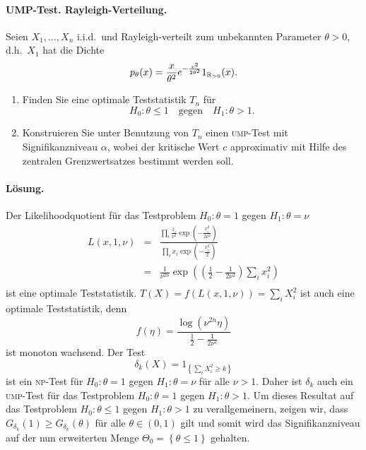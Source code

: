 






\paragraph{UMP-Test. Rayleigh-Verteilung. } Seien $X_1,\ldots,X_n$ i.i.d.\ und Rayleigh-verteilt
zum unbekannten Parameter $\theta>0$, d.h.\ $X_1$ hat die Dichte 
\begin{equation}
    p_\theta(x) = \frac{x}{\theta^2} e^{- \frac{x^2}{2\theta^2}} 1_{\mathbb R_{>0}}(x).
\end{equation}
\begin{enumerate}
    \item Finden Sie eine optimale Teststatistik $T_n$ für
        \begin{equation}
            H_0 : \theta\leq 1 \quad \textrm{gegen} \quad H_1 : \theta >1.
        \end{equation}
    \item Konstruieren Sie unter Benutzung von $T_n$ einen \textsc{ump}-Test mit Signifikanzniveau 
        $\alpha$, wobei der kritische Wert $c$ approximativ mit Hilfe des zentralen Grenzwertsatzes
        bestimmt werden soll.
\end{enumerate}

\paragraph*{Lösung. } Der Likelihoodquotient für das Testproblem $H_0: \theta=1$ gegen $H_1 : \theta=\nu$
\begin{eqnarray}
    L(x,1,\nu) &=& 
    \frac{\prod_i \frac{x_i}{\nu^2} \exp \left( -\frac{x_i^2}{2 \nu^2} \right)}{ \prod_i x_i \exp \left( - \frac{x_i^2}{2} \right)  } \\
    &=& \frac{1}{ \nu^{2n}} \exp\left( \left( \frac{1}{2} -\frac{1}{2 \nu^2} \right) \sum_{i}^{} x_i^2 \right)\\
\end{eqnarray}
ist eine optimale Teststatistik. $T(X)=f(L(x,1,\nu))= \sum_{i}^{} X_i^2$ 
ist auch eine optimale Teststatistik, denn
\begin{equation}
    f(\eta) = \frac{ \log \left( \nu^{2n} \eta \right) }{\frac{1}{2} - \frac{1}{2\nu^2}}
\end{equation}
ist monoton wachsend. Der Test
\begin{equation}
    \delta_k(X) = 1_{  \left\{ \sum_{i}^{}X_i^2 \geq k \right\} }
\end{equation}
ist ein \textsc{np}-Test für $H_0: \theta=1$ gegen $H_1 : \theta= \nu$ für alle $\nu>1$.
Daher ist $\delta_k$ auch ein \textsc{ump}-Test für das Testproblem $H_0: \theta=1$ gegen $H_1 : \theta>1$.
Um dieses Resultat auf das Testproblem $H_0: \theta \leq 1$ gegen $H_1 : \theta>1$ zu verallgemeinern, zeigen
wir, dass $G_{\delta_k}(1)\geq G_{\delta_k} (\theta)$ für alle $\theta \in (0,1)$ gilt und somit wird das
Signifikanzniveau auf der nun erweiterten Menge $\Theta_0 = \left\{ \theta\leq 1 \right\}$ gehalten.

